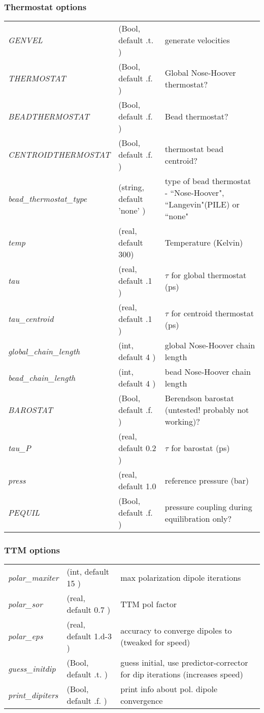\documentclass[10pt]{article}
\begin{document}
\subsubsection*{Thermostat options}
\begin{tabular}{l l p{6cm}}
\textit{GENVEL} &(Bool, default   .t.	   )&     generate velocities \\
\textit{THERMOSTAT } &(Bool, default   .f.  )&      Global Nose-Hoover thermostat? \\
\textit{BEADTHERMOSTAT} &(Bool, default   .f. )&   Bead thermostat? \\
\textit{CENTROIDTHERMOSTAT} &(Bool, default   .f. )&  thermostat bead centroid? \\
\textit{bead\_thermostat\_type} &(string, default  'none' )&  type of bead thermostat - ``Nose-Hoover", ``Langevin"(PILE) or ``none"\\
\textit{temp} &(real, default 300)&            Temperature (Kelvin) \\
\textit{tau} &(real, default .1 ) & $\tau$ for global thermostat (ps)\\
\textit{tau\_centroid } &(real, default .1 )&  $\tau$ for centroid thermostat (ps)\\
\textit{global\_chain\_length} &(int, default 4 )&  global Nose-Hoover chain length\\
\textit{bead\_chain\_length} &(int, default 4  )&   bead Nose-Hoover chain length\\
\textit{BAROSTAT} &(Bool, default  .f. )&        Berendson barostat (untested! probably not working)?\\
\textit{tau\_P } &(real, default 0.2   )&       $\tau$ for barostat (ps)\\
\textit{press} &(real, default  1.0    &       reference pressure (bar) \\
\textit{PEQUIL} &(Bool, default  .f.	)& 	   pressure coupling during equilibration only?\\

\end{tabular}

\subsubsection*{TTM options}
\begin{tabular}{l l p{6cm}}
\textit{polar\_maxiter}&(int, default  15    )&   max polarization dipole iterations \\
\textit{polar\_sor }&(real, default     0.7  )& TTM pol factor\\
\textit{polar\_eps  }&(real, default    1.d-3 )& accuracy to converge dipoles to (tweaked for speed) \\
\textit{guess\_initdip}&(Bool, default  .t.   )& guess initial, use predictor-corrector for dip iterations (increases speed) \\
\textit{print\_dipiters} &(Bool, default   .f. )&  print info about pol. dipole convergence \\
\end{tabular}
\end{document}
